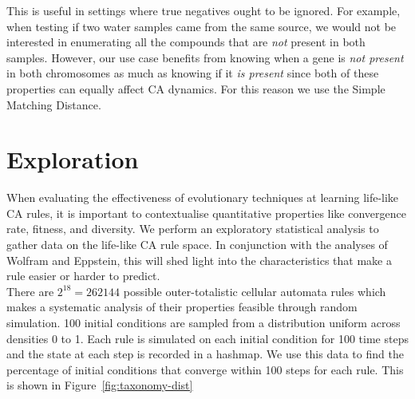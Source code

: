 This is useful in settings where true negatives ought to be ignored. For example, when testing if two water samples came from the same source, we would not be interested in enumerating all the compounds that are \textit{not} present in both samples. However, our use case benefits from knowing when a gene is \textit{not present} in both chromosomes as much as knowing if it \textit{is present} since both of these properties can equally affect CA dynamics. For this reason we use the Simple Matching Distance.

\section{Exploration}

When evaluating the effectiveness of evolutionary techniques at learning life-like CA rules, it is important to contextualise quantitative properties like convergence rate, fitness, and diversity. We perform an exploratory statistical analysis to gather data on the life-like CA rule space. In conjunction with the analyses of Wolfram\cite{wolfram1986theory} and Eppstein\cite{eppstein2010growth}, this will shed light into the characteristics that make a rule easier or harder to predict.\\

There are $2^{18} = 262144$ possible outer-totalistic cellular automata rules which makes a systematic analysis of their properties feasible through random simulation. 100 initial conditions are sampled from a distribution uniform across densities 0 to 1. Each rule is simulated on each initial condition for 100 time steps and the state at each step is recorded in a hashmap. We use this data to find the percentage of initial conditions that converge within 100 steps for each rule. This is shown in Figure~\ref{fig:taxonomy-dist}\\   

